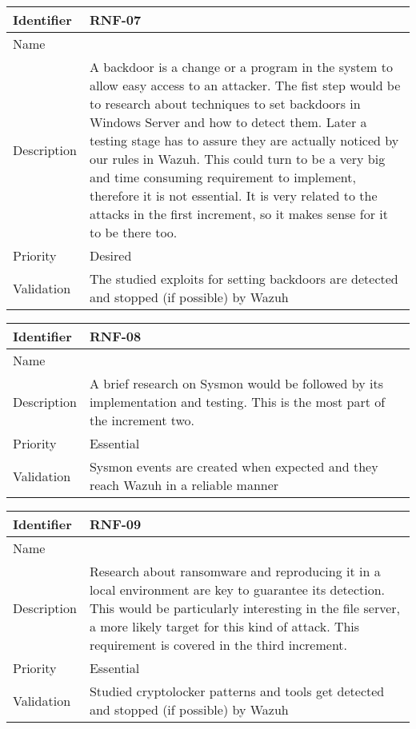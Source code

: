 \begin{table}[H]
	\begin{tabularx}{\textwidth}{|l|X|}
		\hline
		\rowcolor{gray!30}
		Identifier & \textbf{RNF-07} \\ \hline
		Name & \RNFsiete \\ \hline
		Description & A backdoor is a change or a program in the system to allow easy access to an attacker. The fist step would be to research about techniques to set backdoors in Windows Server and how to detect them. Later a testing stage has to assure they are actually noticed by our rules in Wazuh. This could turn to be a very big and time consuming requirement to implement, therefore it is not essential. It is very related to the attacks in the first increment, so it makes sense for it to be there too.  \\ \hline
		Priority & Desired \\ \hline
		Validation & The studied exploits for setting backdoors are detected and stopped (if possible) by Wazuh  \\ \hline
	\end{tabularx}
\end{table}
\begin{table}[H]
	\begin{tabularx}{\textwidth}{|l|X|}
		\hline
		\rowcolor{gray!30}
		Identifier & \textbf{RNF-08} \\ \hline
		Name & \RNFocho \\ \hline
		Description & A brief research on Sysmon would be followed by its implementation and testing. This is the most part of the increment two. \\ \hline
		Priority & Essential \\ \hline
		Validation & Sysmon events are created when expected and they reach Wazuh in a reliable manner \\ \hline
	\end{tabularx}
\end{table}
\begin{table}[H]
	\begin{tabularx}{\textwidth}{|l|X|}
		\hline
		\rowcolor{gray!30}
		Identifier & \textbf{RNF-09} \\ \hline
		Name & \RNFnueve \\ \hline
		Description & Research about ransomware and reproducing it in a local environment are key to guarantee its detection. This would be particularly interesting in the file server, a more likely target for this kind of attack. This requirement is covered in the third increment. \\ \hline
		Priority & Essential \\ \hline
		Validation & Studied cryptolocker patterns and tools get detected and stopped (if possible) by Wazuh  \\ \hline
	\end{tabularx}
\end{table}
